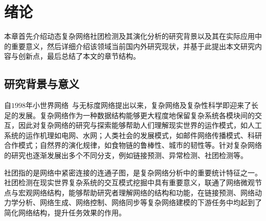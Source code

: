 
\baselineskip 20pt

\chapter{绪论}
\label{chap:1}

本章首先介绍动态复杂网络社团检测及其演化分析的研究背景以及其在实际应用中的重要意义，然后详细介绍该领域当前国内外研究现状，并基于此提出本文研究内容与创新点，最后总结了本文的章节结构。
 


\section{研究背景与意义}




自$1998$年小世界网络~\cite{watts1998collective}与无标度网络\cite{albert1999diameter}提出以来，复杂网络及复杂性科学即迎来了长足的发展。复杂网络作为一种数据结构能够更大程度地保留复杂系统各模块间的交互，因此对复杂网络的研究与探索能够帮助人们理解现实世界的运作模式，如人工系统的运作机理如电网\cite{mets2014combining}、水网\cite{bodini2002towards}；人类社会的发展模式，如邮件网络传播模式\cite{barnes2024temporal}、科研合作模式\cite{mariani2024collective}；自然界的演化规律，如食物链的鲁棒性\cite{dunne2002food}、城市的韧性\cite{zhang2018review}等。针对复杂网络的研究也逐渐发展出多个不同分支，例如链接预测\cite{zhu2016scalable}、异常检测\cite{ahmed2016survey}、社团检测等\cite{kumar2024community}。


社团指的是网络中紧密连接的连通子图，是复杂网络分析中的重要统计特征之一。社团检测在现实世界复杂系统的交互模式挖掘中具有重要意义，联通了网络微观节点与宏观网络结构，能够帮助研究者理解网络的结构和功能，在链接预测、网络动力学分析、网络生成、网络控制、网络同步等复杂网络建模的下游任务中均起到了简化网络结构，提升任务效果的作用\cite{kumar2024community,fortunato2016community}。

